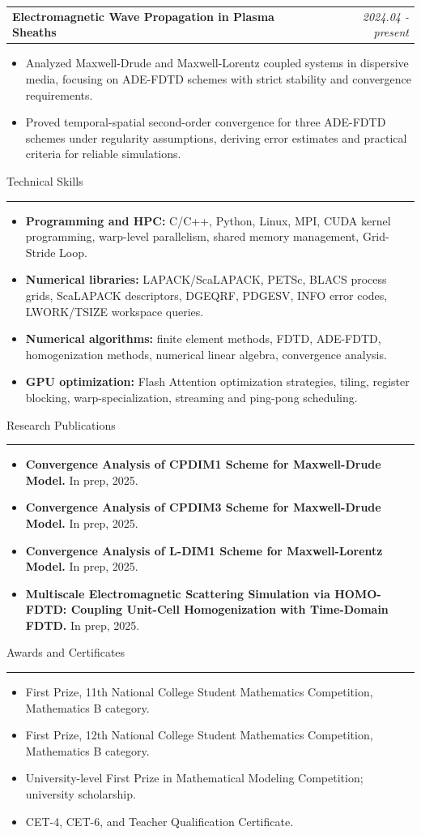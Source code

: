 \documentclass[10pt,a4paper]{article}
\makeatletter
\newcommand{\sectiontitle}[1]{%
  \vspace{0.55em}%
  {\Large #1}\par\vspace{-0.55em}%
  \noindent\rule{\textwidth}{0.4pt}\vspace{0.2em}%
}
\newcommand{\datedentry}[2]{%
  \noindent\begin{tabularx}{\textwidth}{@{}Xr@{}}
    #1 & {\itshape\color{muted} #2}
  \end{tabularx}\vspace{-0.35em}
}
\makeatother
\begin{document}
\datedentry{\textbf{Electromagnetic Wave Propagation in Plasma Sheaths}}{2024.04 - present}
\begin{itemize}
  \item Analyzed Maxwell-Drude and Maxwell-Lorentz coupled systems in dispersive media, focusing on ADE-FDTD schemes with strict stability and convergence requirements.
  \item Proved temporal-spatial second-order convergence for three ADE-FDTD schemes under regularity assumptions, deriving error estimates and practical criteria for reliable simulations.
\end{itemize}

\sectiontitle{Technical Skills}
\begin{itemize}
  \item \textbf{Programming and HPC:} C/C++, Python, Linux, MPI, CUDA kernel programming, warp-level parallelism, shared memory management, Grid-Stride Loop.
  \item \textbf{Numerical libraries:} LAPACK/ScaLAPACK, PETSc, BLACS process grids, ScaLAPACK descriptors, DGEQRF, PDGESV, INFO error codes, LWORK/TSIZE workspace queries.
  \item \textbf{Numerical algorithms:} finite element methods, FDTD, ADE-FDTD, homogenization methods, numerical linear algebra, convergence analysis.
  \item \textbf{GPU optimization:} Flash Attention optimization strategies, tiling, register blocking, warp-specialization, streaming and ping-pong scheduling.
\end{itemize}

\sectiontitle{Research Publications}
\begin{itemize}
  \item \textbf{Convergence Analysis of CPDIM1 Scheme for Maxwell-Drude Model.} In prep, 2025.
  \item \textbf{Convergence Analysis of CPDIM3 Scheme for Maxwell-Drude Model.} In prep, 2025.
  \item \textbf{Convergence Analysis of L-DIM1 Scheme for Maxwell-Lorentz Model.} In prep, 2025.
  \item \textbf{Multiscale Electromagnetic Scattering Simulation via HOMO-FDTD: Coupling Unit-Cell Homogenization with Time-Domain FDTD.} In prep, 2025.
\end{itemize}

\sectiontitle{Awards and Certificates}
\begin{itemize}
  \item First Prize, 11th National College Student Mathematics Competition, Mathematics B category.
  \item First Prize, 12th National College Student Mathematics Competition, Mathematics B category.
  \item University-level First Prize in Mathematical Modeling Competition; university scholarship.
  \item CET-4, CET-6, and Teacher Qualification Certificate.
\end{itemize}
\end{document}

